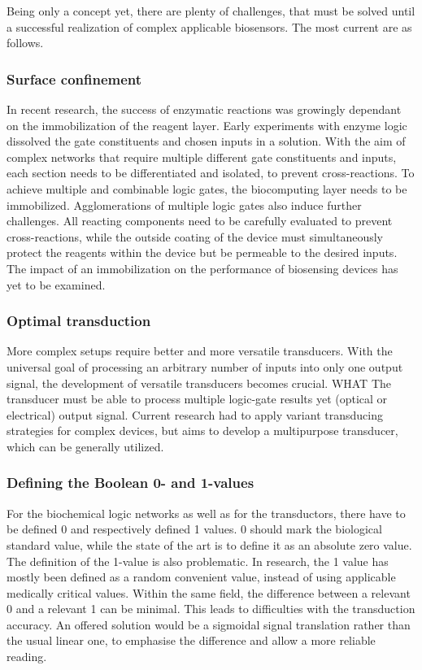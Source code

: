 \documentclass[runningheads]{llncs}
\begin{document}
Being only a concept yet, there are plenty of challenges, that must be solved until a successful realization of complex applicable biosensors. The most current are as follows.

\subsubsection{Surface confinement}	In recent research, the success of enzymatic reactions was growingly dependant on the immobilization of the reagent layer. Early experiments with enzyme logic dissolved the gate constituents and chosen inputs in a solution. With the aim of complex networks that require multiple different gate constituents and inputs, each section needs to be differentiated and isolated, to prevent cross-reactions. To achieve multiple and combinable logic gates, the biocomputing layer needs to be immobilized. Agglomerations of multiple logic gates also induce further challenges. All reacting components need to be carefully evaluated to prevent cross-reactions, while the outside coating of the device must simultaneously protect the reagents within the device but be permeable to the desired inputs. The impact of an immobilization on the performance of biosensing devices has yet to be examined.\cite{original}

\subsubsection{Optimal transduction} More complex setups require better and more versatile transducers. With the universal goal of processing an arbitrary number of inputs into only one output signal, the development of versatile transducers becomes crucial. WHAT The transducer must be able to process multiple logic-gate results yet (optical or electrical) output signal. Current research had to apply variant transducing strategies for complex devices, but aims to develop a multipurpose transducer, which can be generally utilized.\cite{original}

\subsubsection{Defining the Boolean 0- and 1-values} For the biochemical logic networks as well as for the transductors, there have to be defined 0 and respectively defined 1 values. 0 should mark the biological standard value, while the state of the art is to define it as an absolute zero value. The definition of the 1-value is also problematic. In research, the 1 value has mostly been defined as a random convenient value, instead of using applicable medically critical values. Within the same field, the difference between a relevant 0 and a relevant 1 can be minimal. This leads to difficulties with the transduction accuracy. An offered solution would be a sigmoidal signal translation rather than the usual linear one, to emphasise the difference and allow a more reliable reading.\cite{original}
\end{document}
